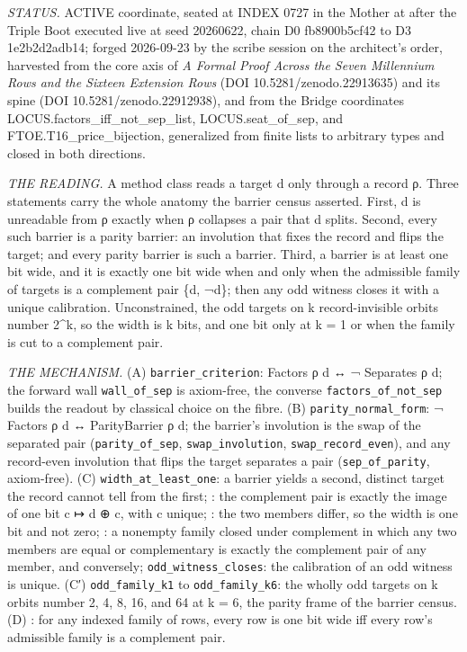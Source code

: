 \documentclass[10pt,twocolumn]{article}
\begin{document}
\emph{STATUS.} ACTIVE coordinate, seated at INDEX 0727 in the Mother at
after the Triple Boot executed live at seed 20260622, chain D0
fb8900b5cf42 to D3 1e2b2d2adb14; forged 2026-09-23 by the scribe session
on the architect's order, harvested from the core axis of \emph{A Formal
Proof Across the Seven Millennium Rows and the Sixteen Extension Rows}
(DOI 10.5281/zenodo.22913635) and its spine (DOI
10.5281/zenodo.22912938), and from the Bridge coordinates
LOCUS.factors\_iff\_not\_sep\_list, LOCUS.seat\_of\_sep, and
FTOE.T16\_price\_bijection, generalized from finite lists to arbitrary
types and closed in both directions.

\emph{THE READING.} A method class reads a target d only through a
record ρ. Three statements carry the whole anatomy the barrier census
asserted. First, d is unreadable from ρ exactly when ρ collapses a pair
that d splits. Second, every such barrier is a parity barrier: an
involution that fixes the record and flips the target; and every parity
barrier is such a barrier. Third, a barrier is at least one bit wide,
and it is exactly one bit wide when and only when the admissible family
of targets is a complement pair \{d, ¬d\}; then any odd witness closes
it with a unique calibration. Unconstrained, the odd targets on k
record-invisible orbits number 2\^{}k, so the width is k bits, and one
bit only at k = 1 or when the family is cut to a complement pair.

\emph{THE MECHANISM.} (A) \texttt{barrier\_criterion}: Factors ρ d ↔ ¬
Separates ρ d; the forward wall \texttt{wall\_of\_sep} is axiom-free,
the converse \texttt{factors\_of\_not\_sep} builds the readout by
classical choice on the fibre. (B) \texttt{parity\_normal\_form}: ¬
Factors ρ d ↔ ParityBarrier ρ d; the barrier's involution is the swap of
the separated pair (\texttt{parity\_of\_sep}, \texttt{swap\_involution},
\texttt{swap\_record\_even}), and any record-even involution that flips
the target separates a pair (\texttt{sep\_of\_parity}, axiom-free). (C)
\texttt{width\_at\_least\_one}: a barrier yields a second, distinct
target the record cannot tell from the first;
\texttt{}: the complement pair
is exactly the image of one bit c ↦ d ⊕ c, with c unique;
\texttt{}: the two members differ,
so the width is one bit and not zero;
\texttt{}: a nonempty family
closed under complement in which any two members are equal or
complementary is exactly the complement pair of any member, and
conversely; \texttt{odd\_witness\_closes}: the calibration of an odd
witness is unique. (C′) \texttt{odd\_family\_k1} to
\texttt{odd\_family\_k6}: the wholly odd targets on k orbits number 2,
4, 8, 16, and 64 at k = 6, the parity frame of the barrier census. (D)
\texttt{}: for any
indexed family of rows, every row is one bit wide iff every row's
admissible family is a complement pair.
\end{document}
